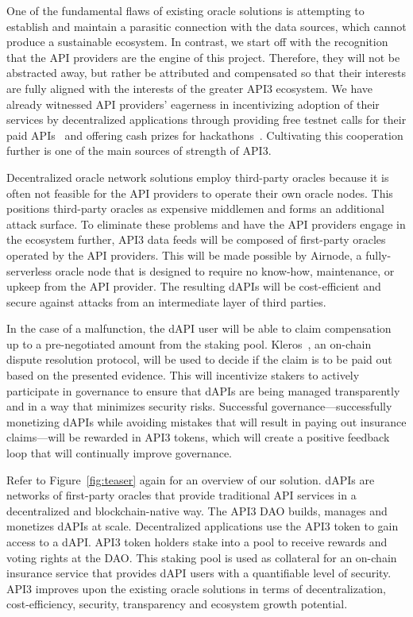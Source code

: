 \documentclass[11pt]{article}
\begin{document}
One of the fundamental flaws of existing oracle solutions is attempting to establish and maintain a parasitic connection with the data sources, which cannot produce a sustainable ecosystem.
In contrast, we start off with the recognition that the API providers are the engine of this project.
Therefore, they will not be abstracted away, but rather be attributed and compensated so that their interests are fully aligned with the interests of the greater API3 ecosystem.
We have already witnessed API providers’ eagerness in incentivizing adoption of their services by decentralized applications through providing free testnet calls for their paid APIs~\cite{honeycomb.market} and offering cash prizes for hackathons~\cite{honeycomb-hackathon}.
Cultivating this cooperation further is one of the main sources of strength of API3.

Decentralized oracle network solutions employ third-party oracles because it is often not feasible for the API providers to operate their own oracle nodes.
This positions third-party oracles as expensive middlemen and forms an additional attack surface.
To eliminate these problems and have the API providers engage in the ecosystem further, API3 data feeds will be composed of first-party oracles operated by the API providers.
This will be made possible by Airnode, a fully-serverless oracle node that is designed to require no know-how, maintenance, or upkeep from the API provider.
The resulting dAPIs will be cost-efficient and secure against attacks from an intermediate layer of third parties.

In the case of a malfunction, the dAPI user will be able to claim compensation up to a pre-negotiated amount from the staking pool.
Kleros~\cite{kleros:2019}, an on-chain dispute resolution protocol, will be used to decide if the claim is to be paid out based on the presented evidence.
This will incentivize stakers to actively participate in governance to ensure that dAPIs are being managed transparently and in a way that minimizes security risks.
Successful governance---successfully monetizing dAPIs while avoiding mistakes that will result in paying out insurance claims---will be rewarded in API3 tokens, which will create a positive feedback loop that will continually improve governance.

Refer to Figure~\ref{fig:teaser} again for an overview of our solution.
dAPIs are networks of first-party oracles that provide traditional API services in a decentralized and blockchain-native way.
The API3 DAO builds, manages and monetizes dAPIs at scale.
Decentralized applications use the API3 token to gain access to a dAPI.
API3 token holders stake into a pool to receive rewards and voting rights at the DAO.
This staking pool is used as collateral for an on-chain insurance service that provides dAPI users with a quantifiable level of security.
API3 improves upon the existing oracle solutions in terms of decentralization, cost-efficiency, security, transparency and ecosystem growth potential.
\end{document}
